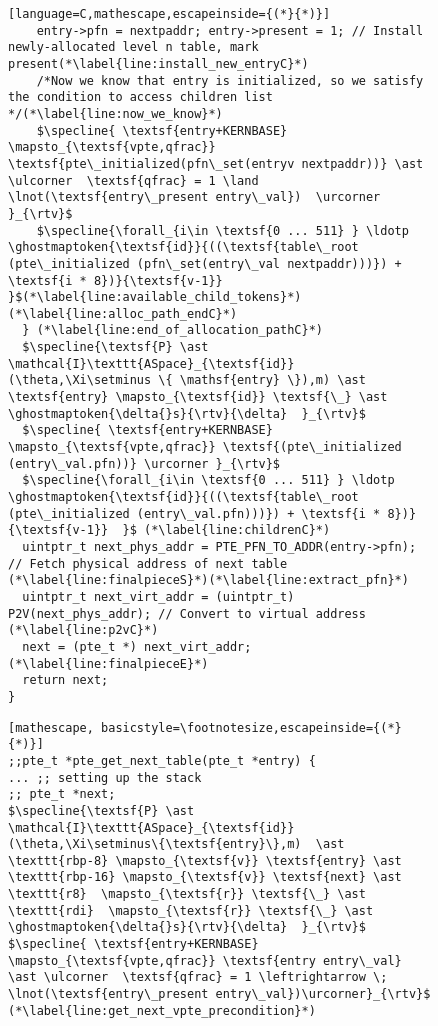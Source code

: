 \begin{figure}
\begin{lstlisting}[language=C,mathescape,escapeinside={(*}{*)}]
    entry->pfn = nextpaddr; entry->present = 1; // Install newly-allocated level n table, mark present(*\label{line:install_new_entryC}*)
    /*Now we know that entry is initialized, so we satisfy the condition to access children list */(*\label{line:now_we_know}*)
    $\specline{ \textsf{entry+KERNBASE} \mapsto_{\textsf{vpte,qfrac}}  \textsf{pte\_initialized(pfn\_set(entryv nextpaddr))} \ast \ulcorner  \textsf{qfrac} = 1 \land \lnot(\textsf{entry\_present entry\_val})  \urcorner }_{\rtv}$
    $\specline{\forall_{i\in \textsf{0 ... 511} } \ldotp  \ghostmaptoken{\textsf{id}}{((\textsf{table\_root (pte\_initialized (pfn\_set(entry\_val nextpaddr)))}) + \textsf{i * 8})}{\textsf{v-1}}  }$(*\label{line:available_child_tokens}*) (*\label{line:alloc_path_endC}*)
  } (*\label{line:end_of_allocation_pathC}*)
  $\specline{\textsf{P} \ast \mathcal{I}\texttt{ASpace}_{\textsf{id}}(\theta,\Xi\setminus \{ \mathsf{entry} \}),m) \ast \textsf{entry} \mapsto_{\textsf{id}} \textsf{\_} \ast \ghostmaptoken{\delta{}s}{\rtv}{\delta}  }_{\rtv}$
  $\specline{ \textsf{entry+KERNBASE} \mapsto_{\textsf{vpte,qfrac}} \textsf{(pte\_initialized (entry\_val.pfn))} \urcorner }_{\rtv}$
  $\specline{\forall_{i\in \textsf{0 ... 511} } \ldotp  \ghostmaptoken{\textsf{id}}{((\textsf{table\_root (pte\_initialized (entry\_val.pfn)))}) + \textsf{i * 8})}{\textsf{v-1}}  }$ (*\label{line:childrenC}*)
  uintptr_t next_phys_addr = PTE_PFN_TO_ADDR(entry->pfn); // Fetch physical address of next table (*\label{line:finalpieceS}*)(*\label{line:extract_pfn}*)
  uintptr_t next_virt_addr = (uintptr_t) P2V(next_phys_addr); // Convert to virtual address (*\label{line:p2vC}*)
  next = (pte_t *) next_virt_addr;(*\label{line:finalpieceE}*)
  return next;
}
\end{lstlisting}
\else
\begin{lstlisting}[mathescape, basicstyle=\footnotesize,escapeinside={(*}{*)}]
;;pte_t *pte_get_next_table(pte_t *entry) {
... ;; setting up the stack
;; pte_t *next;
$\specline{\textsf{P} \ast \mathcal{I}\texttt{ASpace}_{\textsf{id}}(\theta,\Xi\setminus\{\textsf{entry}\},m)  \ast \texttt{rbp-8} \mapsto_{\textsf{v}} \textsf{entry} \ast  \texttt{rbp-16} \mapsto_{\textsf{v}} \textsf{next} \ast \texttt{r8}  \mapsto_{\textsf{r}} \textsf{\_} \ast \texttt{rdi}  \mapsto_{\textsf{r}} \textsf{\_} \ast \ghostmaptoken{\delta{}s}{\rtv}{\delta}  }_{\rtv}$
$\specline{ \textsf{entry+KERNBASE} \mapsto_{\textsf{vpte,qfrac}} \textsf{entry entry\_val} \ast \ulcorner  \textsf{qfrac} = 1 \leftrightarrow \; \lnot(\textsf{entry\_present entry\_val})\urcorner}_{\rtv}$ (*\label{line:get_next_vpte_precondition}*)

\end{lstlisting}
\end{figure}
